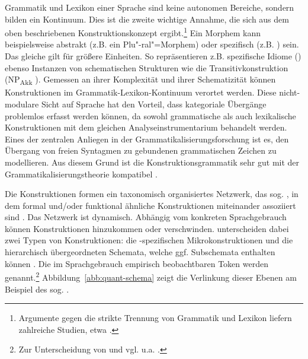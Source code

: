 
Grammatik und Lexikon einer Sprache sind keine autonomen Bereiche, sondern bilden ein Kontinuum. Dies ist die zweite wichtige Annahme, die sich aus dem oben beschriebenen  Konstruktionskonzept ergibt.\footnote{Argumente gegen die strikte Trennung von Grammatik und Lexikon liefern zahlreiche Studien, etwa \textcite{Goldberg2006}.} Ein Morphem kann beispielsweise abstrakt (z.B. ein Plu"-ral"=Morphem) oder spezifisch (z.B. ) sein. Das gleiche gilt für größere Einheiten. So repräsentieren z.B. spezifische Idiome () ebenso Instanzen von schematischen Strukturen wie die Transitivkonstruktion    (NP\textsubscript{Akk} ). Gemessen an ihrer Komplexität und ihrer Schematizität können Konstruktionen im Grammatik-Lexikon-Kontinuum verortet werden. Diese nicht-modulare Sicht auf Sprache hat den Vorteil, dass kategoriale Übergänge problemlos erfasst werden können, da sowohl grammatische als auch lexikalische Konstruktionen mit dem gleichen Analyseinstrumentarium behandelt werden. Eines der zentralen Anliegen in der Grammatikalisierungsforschung ist es, den Übergang von freien Syntagmen zu gebundenen grammatischen Zeichen zu modellieren. Aus diesem Grund ist die Konstruktionsgrammatik sehr gut mit der Grammatikalisierungstheorie kompatibel \parencite[zur weiterführenden Diskussion s. ][85]{Diewald2008}. 


Die Konstruktionen formen ein taxonomisch organisiertes Netzwerk, das sog.  \parencite[95]{Ziem2013}, in dem formal und/oder funktional ähnliche Konstruktionen miteinander assoziiert sind \parencites()()[]{Langacker1987}[262--265]{Croft2004}[]{Bybee2010}. Das Netzwerk ist dynamisch. Abhängig vom konkreten Sprachgebrauch können  Konstruktionen hinzukommen oder verschwinden. \textcite[17]{Traugott2013} unterscheiden dabei zwei Typen von Konstruktionen: die -spezifischen Mikrokonstruktionen und die hierarchisch übergeordneten Schemata, welche ggf. Subschemata enthalten können \parencite[s. auch][]{Traugott2015}. Die im Sprachgebrauch empirisch beobachtbaren Token werden  genannt.\footnote{Zur Unterscheidung von  und  vgl. u.a. \textcite[][423]{Fried2013}.} Abbildung~\ref{abb:quant-schema} zeigt die Verlinkung dieser Ebenen am Beispiel des sog.  \parencite[aus][17]{Traugott2013}. 

